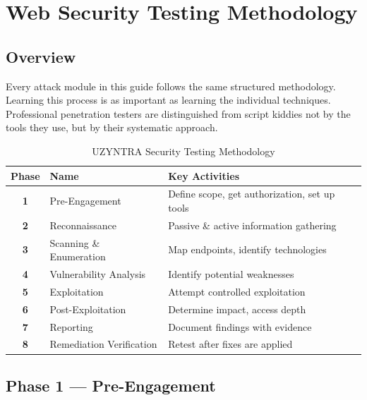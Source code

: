 \chapter{Web Security Testing Methodology}
\label{ch:methodology}

\section{Overview}

Every attack module in this guide follows the same structured methodology. Learning this process is as important as learning the individual techniques. Professional penetration testers are distinguished from script kiddies not by the tools they use, but by their systematic approach.

\begin{table}[H]
\centering
\caption{UZYNTRA Security Testing Methodology}
\begin{tabularx}{\textwidth}{>{\bfseries}clX}
\toprule
Phase & Name & Key Activities \\
\midrule
1 & Pre-Engagement & Define scope, get authorization, set up tools \\
2 & Reconnaissance & Passive \& active information gathering \\
3 & Scanning \& Enumeration & Map endpoints, identify technologies \\
4 & Vulnerability Analysis & Identify potential weaknesses \\
5 & Exploitation & Attempt controlled exploitation \\
6 & Post-Exploitation & Determine impact, access depth \\
7 & Reporting & Document findings with evidence \\
8 & Remediation Verification & Retest after fixes are applied \\
\bottomrule
\end{tabularx}
\end{table}

\section{Phase 1 — Pre-Engagement}

